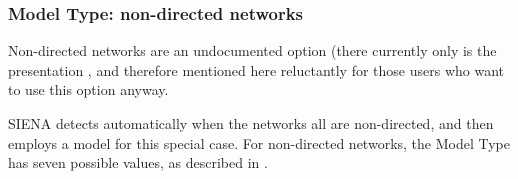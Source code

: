 \documentclass[a4paper,fleqn]{article}
\newcommand{\+}{\, + \,}
\newcommand{\SI}{{\sf SIENA }}
\begin{document}
{

\iffalse
\subsubsection{Model Type: non-directed networks}
\label{S_modeltype_nd}

Non-directed networks are an undocumented option (there currently
only is the presentation \citet{Snijders07}, and therefore
mentioned here reluctantly for those users who want to use
this option anyway.

\SI detects automatically when the networks all are non-directed, and then employs a model for this
special case. For non-directed networks, the Model Type has seven possible values,
as described in \citet{Snijders07}.

}
\end{document}
